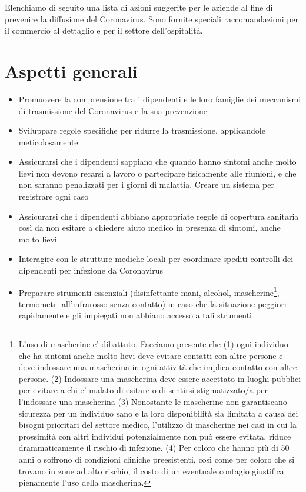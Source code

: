 \documentclass[onecolumn,journal]{IEEEtran}
\begin{document}


\begin{multicols}{2}


Elenchiamo di seguito una lista di azioni suggerite per le aziende al fine di prevenire la diffusione del Coronavirus. Sono fornite speciali raccomandazioni per il commercio al dettaglio e per il settore dell’ospitalità.


\section*{Aspetti generali}
\begin{itemize}
\item Promuovere la comprensione tra i dipendenti e le loro famiglie dei meccanismi di trasmissione del Coronavirus e la sua prevenzione
\item Sviluppare regole specifiche per ridurre la trasmissione, applicandole meticolosamente
\item Assicurarsi che i dipendenti sappiano che quando hanno sintomi anche molto lievi non devono recarsi a lavoro o partecipare fisicamente alle riunioni, e che non saranno penalizzati per i giorni di malattia. Creare un sistema per registrare ogni caso
\item Assicurarsi che i dipendenti abbiano appropriate regole di copertura sanitaria così da non esitare a chiedere aiuto medico in presenza di sintomi, anche molto lievi
\item Interagire con le strutture mediche locali per coordinare spediti controlli dei dipendenti per infezione da Coronavirus
\item Preparare strumenti essenziali (disinfettante mani, alcohol, mascherine\footnote{L’uso di mascherine e’ dibattuto. Facciamo presente che (1) ogni individuo che ha sintomi anche molto lievi deve evitare contatti con altre persone e deve indossare una mascherina in ogni attività che implica contatto con altre persone. (2) Indossare una mascherina deve essere accettato in luoghi pubblici per evitare a chi e’ malato di esitare o di sentirsi stigmatizzato/a per l’indossare una mascherina (3) Nonostante le mascherine non garantiscano sicurezza per un individuo sano e la loro disponibilità sia limitata a causa dei bisogni prioritari del settore medico, l’utilizzo di mascherine nei casi in cui la prossimità con altri individui potenzialmente non può essere evitata, riduce drammaticamente il rischio di infezione. (4) Per coloro che hanno più di 50 anni o soffrono di condizioni cliniche preesistenti, così come per coloro che si trovano in zone ad alto rischio, il costo di un eventuale contagio giustifica pienamente l’uso della mascherina.  }, termometri all’infrarosso senza contatto) in caso che la situazione peggiori rapidamente e gli impiegati non abbiano accesso a tali strumenti

\end{itemize}
\end{multicols}
\end{document}
